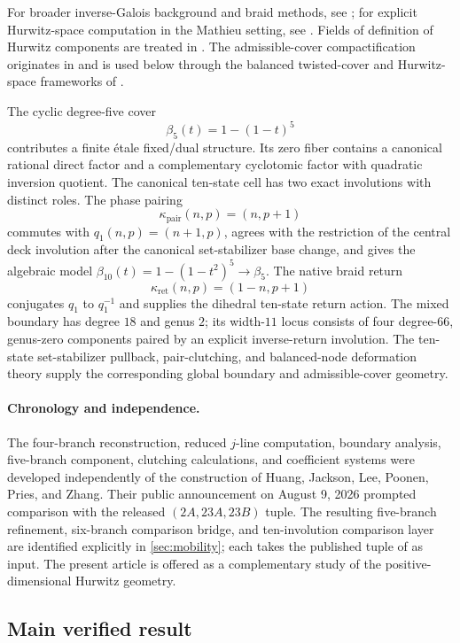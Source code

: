 \documentclass[11pt]{article}
\theoremstyle{remark}
\begin{document}
For broader inverse-Galois background and braid methods, see \cite{MalleMatzat}; for explicit Hurwitz-space computation in the Mathieu setting, see \cite{Koenig}.  Fields of definition of Hurwitz components are treated in \cite{Seguin}.  The admissible-cover compactification originates in \cite{HarrisMumford} and is used below through the balanced twisted-cover and Hurwitz-space frameworks of \cite{AbramovichCortiVistoli,Wewers}.

The cyclic degree-five cover
\[
 \beta_5(t)=1-(1-t)^5
\]
contributes a finite \'etale fixed/dual structure.  Its zero fiber contains a canonical rational direct factor and a complementary cyclotomic factor with quadratic inversion quotient.  The canonical ten-state cell has two exact involutions with distinct roles.  The phase pairing
\[
 \kappa_{\mathrm{pair}}(n,p)=(n,p+1)
\]
commutes with $q_1(n,p)=(n+1,p)$, agrees with the restriction of the central deck involution after the canonical set-stabilizer base change, and gives the algebraic model $\beta_{10}(t)=1-(1-t^2)^5\to\beta_5$.  The native braid return
\[
 \kappa_{\mathrm{ret}}(n,p)=(1-n,p+1)
\]
conjugates $q_1$ to $q_1^{-1}$ and supplies the dihedral ten-state return action.  The mixed boundary has degree $18$ and genus $2$; its width-$11$ locus consists of four degree-$66$, genus-zero components paired by an explicit inverse-return involution.  The ten-state set-stabilizer pullback, pair-clutching, and balanced-node deformation theory supply the corresponding global boundary and admissible-cover geometry.

\paragraph{Chronology and independence.}
The four-branch reconstruction, reduced $j$-line computation, boundary analysis, five-branch component, clutching calculations, and coefficient systems were developed independently of the construction of Huang, Jackson, Lee, Poonen, Pries, and Zhang.  Their public announcement on August 9, 2026 \cite{HuangEtAl} prompted comparison with the released $(2A,23A,23B)$ tuple.  The resulting five-branch refinement, six-branch comparison bridge, and ten-involution comparison layer are identified explicitly in \cref{sec:mobility}; each takes the published tuple of \cite{HuangEtAl} as input.  The present article is offered as a complementary study of the positive-dimensional Hurwitz geometry.

\subsection{Main verified result}
\end{document}
